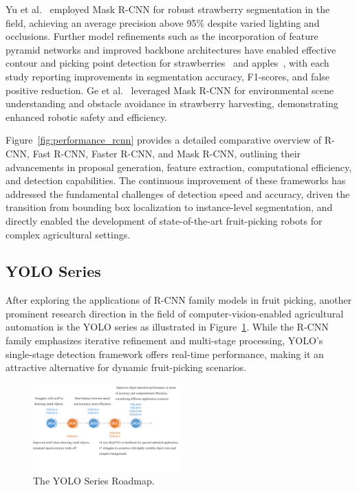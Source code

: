 \documentclass[a4paper,fleqn]{cas-dc}
\begin{document}
Yu et al.~\cite{yu2019fruit} employed Mask R-CNN for robust strawberry segmentation in the field, achieving an average precision above 95\% despite varied lighting and occlusions. Further model refinements such as the incorporation of feature pyramid networks and improved backbone architectures have enabled effective contour and picking point detection for strawberries~\cite{jia2020detection} and apples~\cite{chu2021deep}, with each study reporting improvements in segmentation accuracy, F1-scores, and false positive reduction. Ge et al.~\cite{ge2019fruit} leveraged Mask R-CNN for environmental scene understanding and obstacle avoidance in strawberry harvesting, demonstrating enhanced robotic safety and efficiency.

Figure~\ref{fig:performance_rcnn} provides a detailed comparative overview of R-CNN, Fast R-CNN, Faster R-CNN, and Mask R-CNN, outlining their advancements in proposal generation, feature extraction, computational efficiency, and detection capabilities. The continuous improvement of these frameworks has addressed the fundamental challenges of detection speed and accuracy, driven the transition from bounding box localization to instance-level segmentation, and directly enabled the development of state-of-the-art fruit-picking robots for complex agricultural settings.




\subsection{YOLO Series}
After exploring the applications of R-CNN family models in fruit picking, another prominent research direction in the field of computer-vision-enabled agricultural automation is the YOLO series as illustrated in Figure~\ref{fig:yolo}. While the R-CNN family emphasizes iterative refinement and multi-stage processing, YOLO's single-stage detection framework offers real-time performance, making it an attractive alternative for dynamic fruit-picking scenarios.
\begin{figure}[hbtp]
\centering
\includegraphics[width=0.5\textwidth]{fig_yolo.png}
\caption{The YOLO Series Roadmap.}
\label{fig:yolo}
\end{figure}
\end{document}
